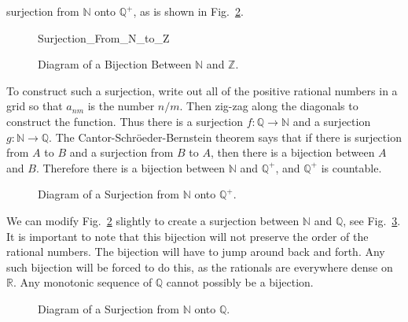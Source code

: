 \documentclass[crop=false,class=book,oneside]{standalone}
\begin{document}
            surjection from $\mathbb{N}$ onto $\mathbb{Q}^{+}$, as is
            shown in
            Fig.~\ref{fig:MEASURE_THEORY:BIJECTION_N_AND_Q_Plus}.
            \newpage
            \begin{figure}[H]
                \centering
                \captionsetup{type=figure}
                {Surjection_From_N_to_Z}
                \caption{Diagram of a Bijection Between
                         $\mathbb{N}$ and $\mathbb{Z}$.}
                \label{fig:MEASURE_THEORY:BIJECTION_N_AND_Z}
            \end{figure}
            To construct such a surjection, write out all of the
            positive rational numbers in a grid so that $a_{nm}$ is
            the number $n/m$. Then zig-zag along the diagonals
            to construct the function. Thus there is a surjection
            $f:\mathbb{Q}\rightarrow\mathbb{N}$
            and a surjection $g:\mathbb{N}\rightarrow\mathbb{Q}$. The
            Cantor-Schr\"{o}eder-Bernstein theorem says that if there
            is surjection from $A$ to $B$ and a surjection from $B$
            to $A$, then there is a bijection between $A$ and $B$.
            Therefore there is a bijection between $\mathbb{N}$ and
            $\mathbb{Q}^{+}$, and $\mathbb{Q}^{+}$ is countable.
            \begin{figure}[H]
                \centering
                \captionsetup{type=figure}
                \caption{Diagram of a Surjection from
                         $\mathbb{N}$ onto $\mathbb{Q}^{+}$.}
                \label{fig:MEASURE_THEORY:BIJECTION_N_AND_Q_Plus}
            \end{figure}
            We can modify
            Fig.~\ref{fig:MEASURE_THEORY:BIJECTION_N_AND_Q_Plus}
            slightly to create a surjection between $\mathbb{N}$ and
            $\mathbb{Q}$, see
            Fig.~\ref{fig:MEASURE_THEORY:BIJECTION_N_AND_Q}.
            It is important to note that this bijection will not
            preserve the order of the rational numbers. The bijection
            will have to jump around back and forth. Any such
            bijection will be forced to do this, as the rationals are
            everywhere dense on $\mathbb{R}$. Any monotonic sequence of
            $\mathbb{Q}$ cannot possibly be a bijection.
            \begin{figure}[H]
                \centering
                \captionsetup{type=figure}
                \caption{Diagram of a Surjection from
                         $\mathbb{N}$ onto $\mathbb{Q}$.}
                \label{fig:MEASURE_THEORY:BIJECTION_N_AND_Q}
            \end{figure}
\end{document}
